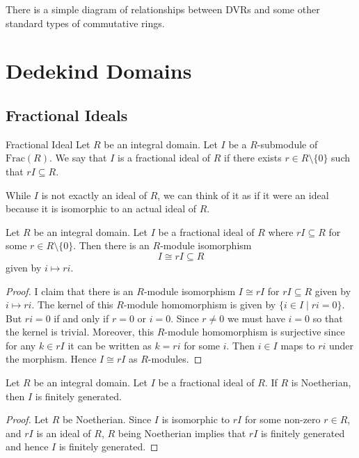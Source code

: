 \documentclass[a4paper]{article}
\begin{document}
There is a simple diagram of relationships between DVRs and some other standard types of commutative rings. 


\pagebreak

\section{Dedekind Domains}
\subsection{Fractional Ideals}
\begin{defn}{Fractional Ideal}{} Let $R$ be an integral domain. Let $I$ be a $R$-submodule of $\text{Frac}(R)$. We say that $I$ is a fractional ideal of $R$ if there exists $r\in R\setminus\{0\}$ such that $rI\subseteq R$. 
\end{defn}

While $I$ is not exactly an ideal of $R$, we can think of it as if it were an ideal because it is isomorphic to an actual ideal of $R$. 

\begin{lmm}{}{} Let $R$ be an integral domain. Let $I$ be a fractional ideal of $R$ where $rI\subseteq R$ for some $r\in R\setminus\{0\}$. Then there is an $R$-module isomorphism $$I\cong rI\subseteq R$$ given by $i\mapsto ri$. \tcbline
\begin{proof}
I claim that there is an $R$-module isomorphism $I\cong rI$ for $rI\subseteq R$ given by $i\mapsto ri$. The kernel of this $R$-module homomorphism is given by $\{i\in I\;|\;ri=0\}$. But $ri=0$ if and only if $r=0$ or $i=0$. Since $r\neq 0$ we must have $i=0$ so that the kernel is trivial. Moreover, this $R$-module homomorphism is surjective since for any $k\in rI$ it can be written as $k=ri$ for some $i$. Then $i\in I$ maps to $ri$ under the morphism. Hence $I\cong rI$ as $R$-modules. 
\end{proof}
\end{lmm}

\begin{lmm}{}{} Let $R$ be an integral domain. Let $I$ be a fractional ideal of $R$. If $R$ is Noetherian, then $I$ is finitely generated. \tcbline
\begin{proof}
Let $R$ be Noetherian. Since $I$ is isomorphic to $rI$ for some non-zero $r\in R$, and $rI$ is an ideal of $R$, $R$ being Noetherian implies that $rI$ is finitely generated and hence $I$ is finitely generated. 
\end{proof}
\end{lmm}
\end{document}
